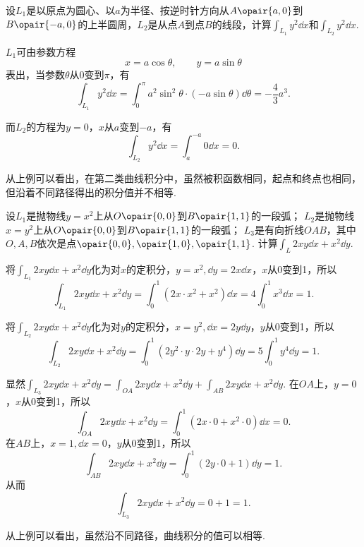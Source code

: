 \begin{example}
设\(L_1\)是以原点为圆心、以\(a\)为半径、按逆时针方向从\(A\opair{a,0}\)到\(B\opair{-a,0}\)的上半圆周，\(L_2\)是从点\(A\)到点\(B\)的线段，计算\(\int_{L_1} y^2 \dd{x}\)和\(\int_{L_2} y^2 \dd{x}\).
\begin{solution}
\(L_1\)可由参数方程\[
x = a \cos\theta, \qquad y = a \sin\theta
\]表出，当参数\(\theta\)从\(0\)变到\(\pi\)，有\[
\int_{L_1} y^2 \dd{x}
= \int_0^{\pi} a^2 \sin^2 \theta \cdot (-a \sin\theta) \dd{\theta}
= -\frac{4}{3} a^3.
\]

而\(L_2\)的方程为\(y=0\)，\(x\)从\(a\)变到\(-a\)，有\[
\int_{L_2} y^2 \dd{x} = \int_a^{-a} 0 \dd{x} = 0.
\]
\end{solution}
\end{example}
从上例可以看出，在第二类曲线积分中，虽然被积函数相同，起点和终点也相同，但沿着不同路径得出的积分值并不相等.

\begin{example}
设\(L_1\)是抛物线\(y=x^2\)上从\(O\opair{0,0}\)到\(B\opair{1,1}\)的一段弧；
\(L_2\)是抛物线\(x=y^2\)上从\(O\opair{0,0}\)到\(B\opair{1,1}\)的一段弧；
\(L_3\)是有向折线\(OAB\)，其中\(O,A,B\)依次是点\(\opair{0,0},\opair{1,0},\opair{1,1}\).
计算\(\int_L 2xy\dd{x}+x^2\dd{y}\).
\begin{solution}
将\(\int_{L_1} 2xy\dd{x}+x^2\dd{y}\)化为对\(x\)的定积分，\(y=x^2, \dd{y}=2x\dd{x}\)，\(x\)从0变到1，所以\[
\int_{L_1} 2xy\dd{x}+x^2\dd{y}
= \int_0^1 (2x \cdot x^2 + x^2) \dd{x}
= 4 \int_0^1 x^3 \dd{x} = 1.
\]

将\(\int_{L_2} 2xy\dd{x}+x^2\dd{y}\)化为对\(y\)的定积分，\(x=y^2, \dd{x}=2y\dd{y}\)，\(y\)从0变到1，所以\[
\int_{L_2} 2xy\dd{x}+x^2\dd{y}
= \int_0^1 (2y^2 \cdot y \cdot 2y + y^4) \dd{y}
= 5 \int_0^1 y^4 \dd{y} = 1.
\]

显然\(\int_{L_3} 2xy\dd{x}+x^2\dd{y} = \int_{OA} 2xy\dd{x}+x^2\dd{y} + \int_{AB} 2xy\dd{x}+x^2\dd{y}\).
在\(OA\)上，\(y=0\)，\(x\)从0变到1，所以\[
\int_{OA} 2xy\dd{x}+x^2\dd{y}
= \int_0^1 (2x\cdot0+x^2\cdot0) \dd{x} = 0.
\]
在\(AB\)上，\(x=1, \dd{x}=0\)，\(y\)从0变到1，所以\[
\int_{AB} 2xy\dd{x}+x^2\dd{y}
= \int_0^1 (2y\cdot0+1) \dd{y} = 1.
\]从而\[
\int_{L_3} 2xy\dd{x}+x^2\dd{y} = 0 + 1 = 1.
\]
\end{solution}
\end{example}
从上例可以看出，虽然沿不同路径，曲线积分的值可以相等.

